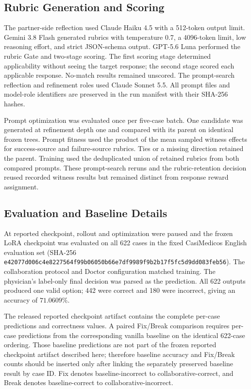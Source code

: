 \subsection{Rubric Generation and Scoring}

The partner-side reflection used Claude Haiku 4.5 with a 512-token output
limit.  Gemini 3.8 Flash generated rubrics with temperature 0.7, a 4096-token
limit, low reasoning effort, and strict JSON-schema output.  GPT-5.6 Luna
performed the rubric Gate and two-stage scoring.  The first scoring stage
determined applicability without seeing the target response; the second stage
scored each applicable response.  No-match results remained unscored.  The
prompt-search reflection and refinement roles used Claude Sonnet 5.5.  All
prompt files and model-role identifiers are preserved in the run manifest with
their SHA-256 hashes.

Prompt optimization was evaluated once per five-case batch.  One candidate was
generated at refinement depth one and compared with its parent on identical
frozen trees.  Prompt fitness used the product of the mean sampled witness
effects for success-source and failure-source rubrics.  Ties or a missing
direction retained the parent.  Training used the deduplicated union of retained
rubrics from both compared prompts.  These prompt-search reruns and the
rubric-retention decision reused recorded witness results but remained distinct
from response reward assignment.

\subsection{Evaluation and Baseline Details}

At reported checkpoint, rollout and optimization were paused and the frozen LoRA checkpoint was
evaluated on all 622 cases in the fixed CasiMedicos English evaluation set
(SHA-256
\texttt{e42077d006c4e8227564f99b06050b66e7df9989f9b2b17f5fc5d9dd083feb56}).
The collaboration protocol and Doctor configuration matched training.  The
physician's label-only final decision was parsed as the prediction.  All 622
outputs produced one valid option; 442 were correct and 180 were incorrect,
giving an accuracy of $71.0609\%$.

The released reported checkpoint artifact contains the complete per-case predictions and
correctness values.  A paired Fix/Break comparison requires per-case predictions
from the corresponding vanilla baseline on the identical 622-case ordering.
Those baseline predictions are not part of the frozen reported checkpoint artifact described
here; therefore baseline accuracy and Fix/Break counts should be inserted only
after linking the separately preserved baseline result by case ID.  Fix denotes
baseline-incorrect to collaborative-correct, and Break denotes
baseline-correct to collaborative-incorrect.

